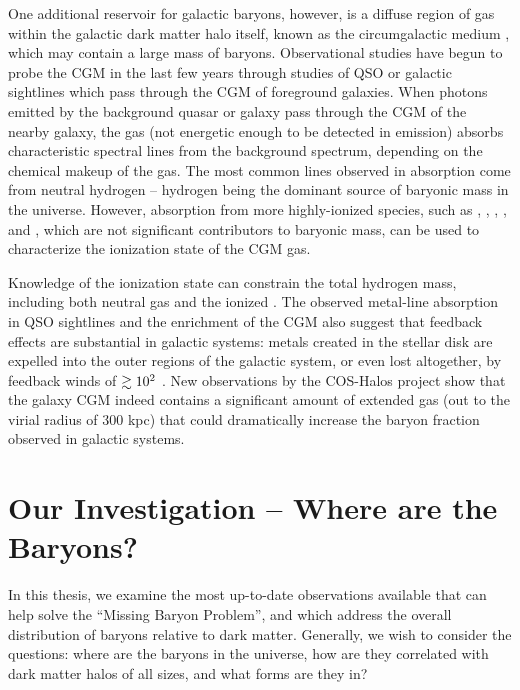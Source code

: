 One additional reservoir for galactic baryons, however, is a diffuse
region of gas within the galactic dark matter halo itself, known as
the circumgalactic medium \citep[CGM, first suggested
  by][]{Bahcall1969, Bergeron1985, Lanzetta1995}, which may contain a
large mass of baryons. Observational studies have begun to probe the
CGM in the last few years through studies of QSO or galactic
sightlines which pass through the CGM of foreground
galaxies\citep{Steidel2010, Prochaska2011, Tumlinson2011,
  Werk2013}. When photons emitted by the background quasar or galaxy
pass through the CGM of the nearby galaxy, the gas (not energetic
enough to be detected in emission) absorbs characteristic spectral
lines from the background spectrum, depending on the chemical makeup
of the gas. The most common lines observed in absorption come from
neutral hydrogen -- hydrogen being the dominant source of baryonic
mass in the universe. However, absorption from more highly-ionized
species, such as  \citep{Zhu2013}, ,
, , and  \citep{Tumlinson2011,
  Werk2014}, which are not significant contributors to baryonic mass,
can be used to characterize the ionization state of the CGM gas.

Knowledge of the ionization state can constrain the total hydrogen
mass, including both neutral  gas and the ionized
. The observed metal-line absorption in QSO sightlines and
the enrichment of the CGM also suggest that feedback effects are
substantial in galactic systems: metals created in the stellar disk
are expelled into the outer regions of the galactic system, or even
lost altogether, by feedback winds of $\gtrsim 10^2$ \kms{}
\citep{D'Odorico1991, Chen2010, Oppenheimer2012, Booth2012}. New
observations by the COS-Halos project show that the galaxy CGM indeed
contains a significant amount of extended gas (out to the virial
radius of 300 kpc) that could dramatically increase the baryon
fraction observed in galactic systems. 

\section{Our Investigation -- Where are the Baryons?}
\label{sec:investigation}

In this thesis, we examine the most up-to-date observations available
that can help solve the ``Missing Baryon Problem'', and which address
the overall distribution of baryons relative to dark
matter. Generally, we wish to consider the questions: where are the
baryons in the universe, how are they correlated with dark matter
halos of all sizes, and what forms are they in?

